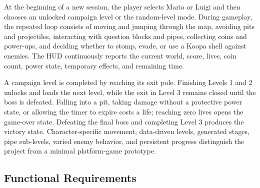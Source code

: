 \documentclass{template}
\begin{document}
At the beginning of a new session, the player selects Mario or Luigi and then
chooses an unlocked campaign level or the random-level mode. During gameplay,
the repeated loop consists of moving and jumping through the map, avoiding
pits and projectiles, interacting with question blocks and pipes, collecting
coins and power-ups, and deciding whether to stomp, evade, or use a Koopa shell
against enemies. The HUD continuously reports the current world, score, lives,
coin count, power state, temporary effects, and remaining time.

A campaign level is completed by reaching its exit pole. Finishing Levels 1
and 2 unlocks and loads the next level, while the exit in Level 3 remains
closed until the boss is defeated. Falling into a pit, taking damage without a
protective power state, or allowing the timer to expire costs a life; reaching
zero lives opens the game-over state. Defeating the final boss and completing
Level 3 produces the victory state. Character-specific movement, data-driven
levels, generated stages, pipe sub-levels, varied enemy behavior, and
persistent progress distinguish the project from a minimal platform-game
prototype.

\subsection{Functional Requirements}
\end{document}
